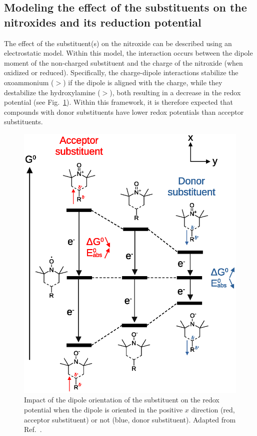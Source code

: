 \documentclass[review,preprint]{elsarticle}
\begin{document}
\subsection{Modeling the effect of the substituents on the nitroxides and its reduction potential}\label{sec:eleczhang}

The effect of the substituent(s) on the nitroxide can be described using an electrostatic model. Within this model, the interaction occurs between the dipole moment of the non-charged substituent and the charge of the nitroxide (when oxidized or reduced).  Specifically, the charge-dipole interactions stabilize the oxoammonium ($>$) if the dipole is aligned with the charge, while they destabilize the hydroxylamine ($>$), both resulting in a decrease in the redox potential (see Fig.~\ref{fig:dipole}). Within this framework, it is therefore expected that compounds with donor substituents have lower redox potentials than acceptor substituents.


\begin{figure}[!h]
	\centering
	\includegraphics[width=\linewidth]{Figure4}
	\caption{Impact of the dipole orientation of the  substituent on the redox potential when the dipole is oriented in  the positive $x$ direction (red, acceptor substituent) or not (blue, donor substituent). Adapted from Ref.~.}
	\label{fig:dipole}
\end{figure}
\end{document}
